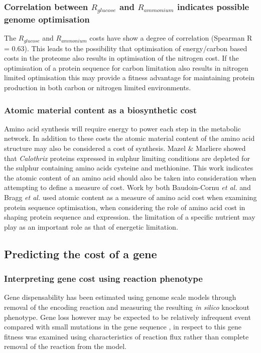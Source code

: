 \subsubsection{Correlation between $R_{glucose}$ and $R_{ammonium}$ indicates possible genome optimisation}%

The $R_{glucose}$ and $R_{ammonium}$ costs have show a degree of correlation (Spearman R = 0.63). This leads to the possibility that optimisation of energy/carbon based costs in the proteome also results in optimisation of the nitrogen cost. If the optimisation of a protein sequence for carbon limitation also results in nitrogen limited optimisation this may provide a fitness advantage for maintaining protein production in both carbon or nitrogen limited environments.

\subsubsection{Atomic material content as a biosynthetic cost}%

Amino acid synthesis will require energy to power each step in the metabolic network. In addition to these costs the atomic material content of the amino acid structure may also be considered a cost of synthesis. Mazel \& Marliere \cite{mazel1989} showed that \emph{Calothrix} proteins expressed in sulphur limiting conditions are depleted for the sulphur containing amino acids cysteine and methionine. This work indicates the atomic content of an amino acid should also be taken into consideration when attempting to define a measure of cost. Work by both Baudoin-Cornu \emph{et al.} \cite{baudoin2001} and Bragg \emph{et al.} \cite{bragg2006} used atomic content as a measure of amino acid cost when examining protein sequence optimisation, when considering the role of amino acid cost in shaping protein sequence and expression. the limitation of a specific nutrient may play as an important role as that of energetic limitation.

\subsection{Predicting the cost of a gene}%

\subsubsection{Interpreting gene cost using reaction phenotype} %

Gene dispensability has been estimated using genome scale models through removal of the encoding reaction and measuring the resulting \emph{in silico} knockout phenotype. Gene loss however may be expected to be relatively infrequent event compared with small mutations in the gene sequence \cite{pal2006}, in respect to this gene fitness was examined using characteristics of reaction flux rather than complete removal of the reaction from the model.

